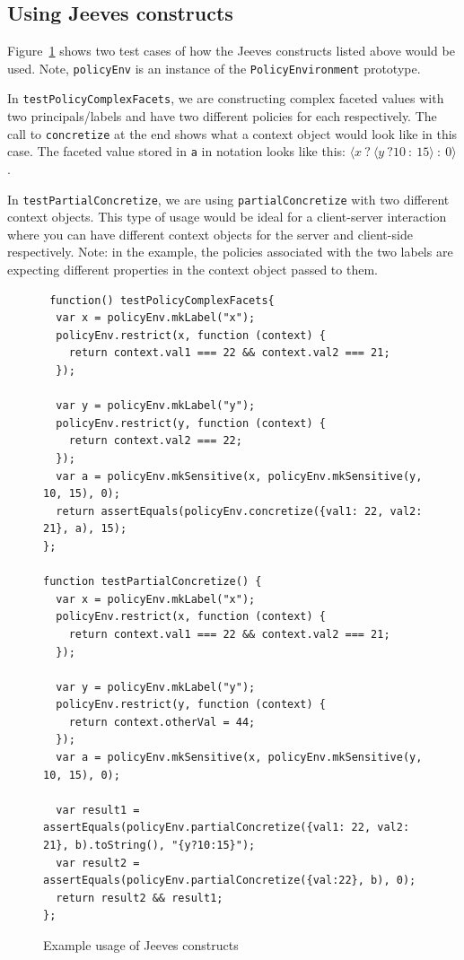 \subsection{Using Jeeves constructs}
Figure~\ref{fig:JeevesExamples} shows two test cases of how the Jeeves constructs
listed above would be used. Note, \texttt{policyEnv} is an instance of the
\texttt{PolicyEnvironment} prototype.

In \texttt{testPolicyComplexFacets}, we are constructing complex faceted values
with two principals/labels and have two different policies for each respectively.
The call to \texttt{concretize} at the end shows what a context object would look
like in this case. The faceted value stored in \texttt{a} in notation looks like
this: $\langle x~?~\langle y~?10~:~15 \rangle~:~0 \rangle$.

In \texttt{testPartialConcretize}, we are using \texttt{partialConcretize} with
two different context objects. This type of usage would be ideal for a client-server
interaction where you can have different context objects for the server and client-side
respectively. Note: in the example, the policies associated with the two labels
are expecting different properties in the context object passed to them.

\begin{figure}
  \begin{lstlisting}
 function() testPolicyComplexFacets{
  var x = policyEnv.mkLabel("x");
  policyEnv.restrict(x, function (context) {
    return context.val1 === 22 && context.val2 === 21;
  });

  var y = policyEnv.mkLabel("y");
  policyEnv.restrict(y, function (context) {
    return context.val2 === 22;
  });
  var a = policyEnv.mkSensitive(x, policyEnv.mkSensitive(y, 10, 15), 0);
  return assertEquals(policyEnv.concretize({val1: 22, val2: 21}, a), 15);
};

function testPartialConcretize() {
  var x = policyEnv.mkLabel("x");
  policyEnv.restrict(x, function (context) {
    return context.val1 === 22 && context.val2 === 21;
  });

  var y = policyEnv.mkLabel("y");
  policyEnv.restrict(y, function (context) {
    return context.otherVal = 44;
  });
  var a = policyEnv.mkSensitive(x, policyEnv.mkSensitive(y, 10, 15), 0);

  var result1 = assertEquals(policyEnv.partialConcretize({val1: 22, val2: 21}, b).toString(), "{y?10:15}");
  var result2 = assertEquals(policyEnv.partialConcretize({val:22}, b), 0);
  return result2 && result1;
};
  \end{lstlisting}
  \caption{Example usage of Jeeves constructs}
  \label{fig:JeevesExamples}
\end{figure}

